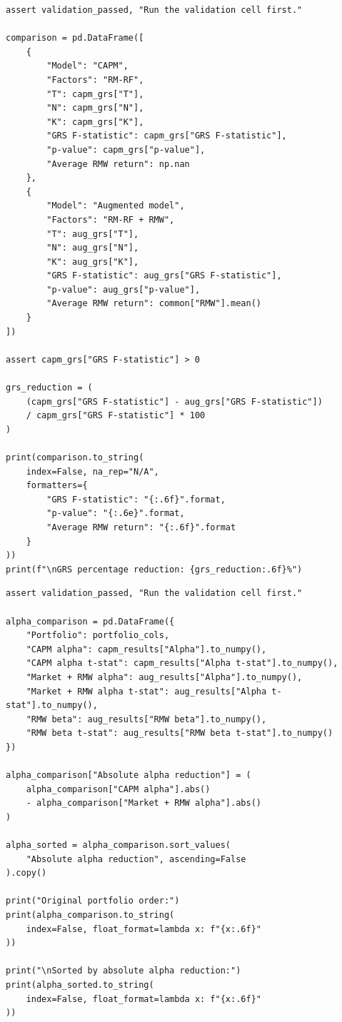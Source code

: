 \documentclass[11pt]{article}
\begin{document}
\begin{lstlisting}
assert validation_passed, "Run the validation cell first."

comparison = pd.DataFrame([
    {
        "Model": "CAPM",
        "Factors": "RM-RF",
        "T": capm_grs["T"],
        "N": capm_grs["N"],
        "K": capm_grs["K"],
        "GRS F-statistic": capm_grs["GRS F-statistic"],
        "p-value": capm_grs["p-value"],
        "Average RMW return": np.nan
    },
    {
        "Model": "Augmented model",
        "Factors": "RM-RF + RMW",
        "T": aug_grs["T"],
        "N": aug_grs["N"],
        "K": aug_grs["K"],
        "GRS F-statistic": aug_grs["GRS F-statistic"],
        "p-value": aug_grs["p-value"],
        "Average RMW return": common["RMW"].mean()
    }
])

assert capm_grs["GRS F-statistic"] > 0

grs_reduction = (
    (capm_grs["GRS F-statistic"] - aug_grs["GRS F-statistic"])
    / capm_grs["GRS F-statistic"] * 100
)

print(comparison.to_string(
    index=False, na_rep="N/A",
    formatters={
        "GRS F-statistic": "{:.6f}".format,
        "p-value": "{:.6e}".format,
        "Average RMW return": "{:.6f}".format
    }
))
print(f"\nGRS percentage reduction: {grs_reduction:.6f}%")
\end{lstlisting}
\begin{lstlisting}
assert validation_passed, "Run the validation cell first."

alpha_comparison = pd.DataFrame({
    "Portfolio": portfolio_cols,
    "CAPM alpha": capm_results["Alpha"].to_numpy(),
    "CAPM alpha t-stat": capm_results["Alpha t-stat"].to_numpy(),
    "Market + RMW alpha": aug_results["Alpha"].to_numpy(),
    "Market + RMW alpha t-stat": aug_results["Alpha t-stat"].to_numpy(),
    "RMW beta": aug_results["RMW beta"].to_numpy(),
    "RMW beta t-stat": aug_results["RMW beta t-stat"].to_numpy()
})

alpha_comparison["Absolute alpha reduction"] = (
    alpha_comparison["CAPM alpha"].abs()
    - alpha_comparison["Market + RMW alpha"].abs()
)

alpha_sorted = alpha_comparison.sort_values(
    "Absolute alpha reduction", ascending=False
).copy()

print("Original portfolio order:")
print(alpha_comparison.to_string(
    index=False, float_format=lambda x: f"{x:.6f}"
))

print("\nSorted by absolute alpha reduction:")
print(alpha_sorted.to_string(
    index=False, float_format=lambda x: f"{x:.6f}"
))
\end{lstlisting}
\end{document}
